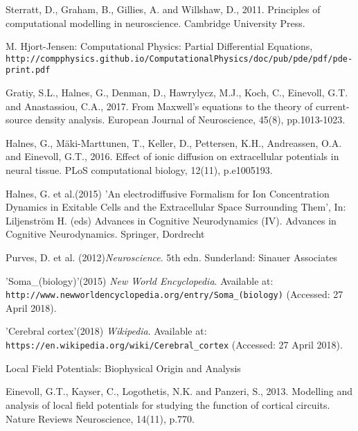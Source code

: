 \documentclass{article}
\begin{document}
\begin{thebibliography}{1}

Sterratt, D., Graham, B., Gillies, A. and Willshaw, D., 2011. Principles of computational modelling in neuroscience. Cambridge University Press.

M. Hjort-Jensen: Computational Physics: Partial Differential Equations,
\\\texttt{http://compphysics.github.io/ComputationalPhysics/doc/pub/pde/pdf/pde-print.pdf}

Gratiy, S.L., Halnes, G., Denman, D., Hawrylycz, M.J., Koch, C., Einevoll, G.T. and Anastassiou, C.A., 2017. From Maxwell's equations to the theory of current-source density analysis. European Journal of Neuroscience, 45(8), pp.1013-1023.


Halnes, G., Mäki-Marttunen, T., Keller, D., Pettersen, K.H., Andreassen, O.A. and Einevoll, G.T., 2016. Effect of ionic diffusion on extracellular potentials in neural tissue. PLoS computational biology, 12(11), p.e1005193.


Halnes, G. et al.(2015) 'An electrodiffusive Formalism for Ion Concentration Dynamics in Exitable Cells and the Extracellular Space Surrounding Them',
In: Liljenström H. (eds) Advances in Cognitive Neurodynamics (IV). Advances in Cognitive Neurodynamics. Springer, Dordrecht


Purves, D. et al. (2012)\textit{Neuroscience}. 5th edn.
Sunderland: Sinauer Associates


'Soma\_(biology)'(2015) \textit{New World Encyclopedia}. Available at:
\\\texttt{http://www.newworldencyclopedia.org/entry/Soma\_(biology)} (Accessed: 27 April 2018).

'Cerebral cortex'(2018) \textit{Wikipedia}. Available at:
\\\texttt{https://en.wikipedia.org/wiki/Cerebral\_cortex} (Accessed: 27 April 2018).


Local	Field	Potentials:	Biophysical	Origin
and	Analysis


Einevoll, G.T., Kayser, C., Logothetis, N.K. and Panzeri, S., 2013. Modelling and analysis of local field potentials for studying the function of cortical circuits. Nature Reviews Neuroscience, 14(11), p.770.




\end{thebibliography}
\end{document}
